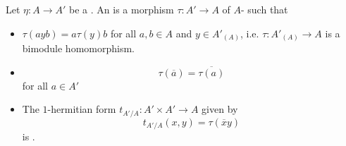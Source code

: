 \begin{definition} \label{definition:involution_trace_map_for_a_morphism_of_involution_rings}
    Let $\eta: A \to A'$ be a . An  is a morphism $\tau: A' \to A$ of $A$- such that  
    \begin{itemize}
        \item $\tau(ayb) = a\tau(y)b$ for all $a,b \in A$ and $y \in A'_{(A)}$, i.e. $\tau: A'_{(A)} \to A$ is a bimodule homomorphism. 

        \item $$\tau(\overline{a}) = \overline{\tau(a)}$$
            for all $a \in A'$

        \item The $1$-hermitian form $t_{A'/A}: A' \times A' \to A$ given by 
        $$t_{A'/A}(x,y) = \tau(\overline{x} y)$$
        is . 
    \end{itemize}

\end{definition}